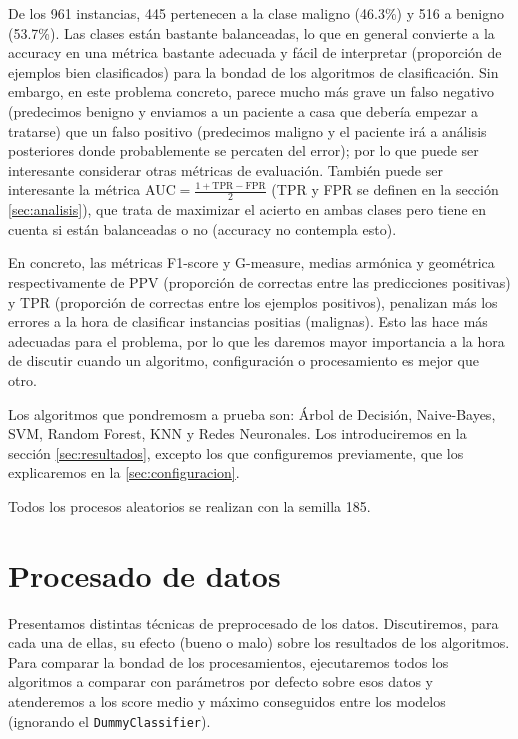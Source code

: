 \documentclass{article}
\begin{document}
De los 961 instancias, 445 pertenecen a la clase maligno (46.3\%) y
516 a benigno (53.7\%). Las clases están bastante balanceadas, lo que
en general convierte a la accuracy en una métrica bastante adecuada y
fácil de interpretar (proporción de ejemplos bien clasificados) para
la bondad de los algoritmos de clasificación. Sin embargo, en este
problema concreto, parece mucho más grave un falso negativo
(predecimos benigno y enviamos a un paciente a casa que debería
empezar a tratarse) que un falso positivo (predecimos maligno y el
paciente irá a análisis posteriores donde probablemente se percaten
del error); por lo que puede ser interesante considerar otras métricas
de evaluación. También puede ser interesante la métrica
AUC$=\frac{1+\text{TPR}-\text{FPR}}{2}$ (TPR y FPR se definen en la
sección \ref{sec:analisis}), que trata de maximizar el acierto en
ambas clases pero tiene en cuenta si están balanceadas o no (accuracy
no contempla esto).

En concreto, las métricas F1-score y G-measure, medias armónica y
geométrica respectivamente de PPV (proporción de correctas entre las
predicciones positivas) y TPR (proporción de correctas entre los
ejemplos positivos), penalizan más los errores a la hora de clasificar
instancias positias (malignas). Esto las hace más adecuadas para el
problema, por lo que les daremos mayor importancia a la hora de
discutir cuando un algoritmo, configuración o procesamiento es mejor
que otro.

Los algoritmos que pondremosm a prueba son: Árbol de Decisión,
Naive-Bayes, SVM, Random Forest, KNN y Redes Neuronales. Los
introduciremos en la sección \ref{sec:resultados}, excepto los que
configuremos previamente, que los explicaremos en la
\ref{sec:configuracion}.

Todos los procesos aleatorios se realizan con la semilla 185.

\section{Procesado de datos}

Presentamos distintas técnicas de preprocesado de los
datos. Discutiremos, para cada una de ellas, su efecto (bueno o malo)
sobre los resultados de los algoritmos. Para comparar la bondad de los
procesamientos, ejecutaremos todos los algoritmos a comparar con
parámetros por defecto sobre esos datos y atenderemos a los score
medio y máximo conseguidos entre los modelos (ignorando el
\texttt{DummyClassifier}).
\end{document}
